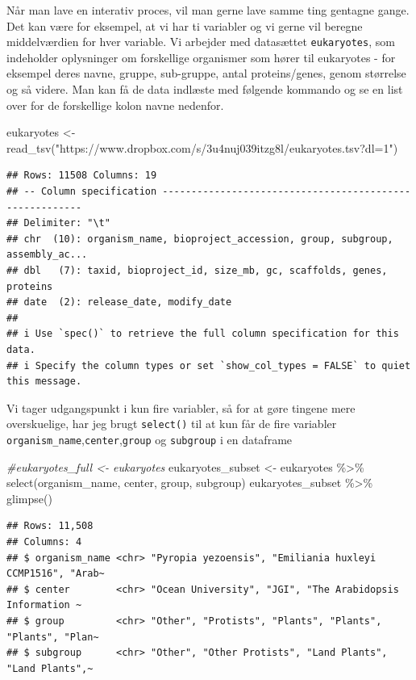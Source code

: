 \documentclass[
]{book}
\newenvironment{Shaded}{\begin{snugshade}}{\end{snugshade}}
\newcommand{\CommentTok}[1]{\textcolor[rgb]{0.56,0.35,0.01}{\textit{#1}}}
\newcommand{\FunctionTok}[1]{\textcolor[rgb]{0.00,0.00,0.00}{#1}}
\newcommand{\NormalTok}[1]{#1}
\newcommand{\OtherTok}[1]{\textcolor[rgb]{0.56,0.35,0.01}{#1}}
\newcommand{\SpecialCharTok}[1]{\textcolor[rgb]{0.00,0.00,0.00}{#1}}
\newcommand{\StringTok}[1]{\textcolor[rgb]{0.31,0.60,0.02}{#1}}
\begin{document}
Når man lave en interativ proces, vil man gerne lave samme ting gentagne gange. Det kan være for eksempel, at vi har ti variabler og vi gerne vil beregne middelværdien for hver variable. Vi arbejder med datasættet \texttt{eukaryotes}, som indeholder oplysninger om forskellige organismer som hører til eukaryotes - for eksempel deres navne, gruppe, sub-gruppe, antal proteins/genes, genom størrelse og så videre. Man kan få de data indlæste med følgende kommando og se en list over for de forskellige kolon navne nedenfor.

\begin{Shaded}
\begin{Highlighting}[]
\NormalTok{eukaryotes }\OtherTok{\textless{}{-}} \FunctionTok{read\_tsv}\NormalTok{(}\StringTok{"https://www.dropbox.com/s/3u4nuj039itzg8l/eukaryotes.tsv?dl=1"}\NormalTok{)}
\end{Highlighting}
\end{Shaded}

\begin{verbatim}
## Rows: 11508 Columns: 19
## -- Column specification --------------------------------------------------------
## Delimiter: "\t"
## chr  (10): organism_name, bioproject_accession, group, subgroup, assembly_ac...
## dbl   (7): taxid, bioproject_id, size_mb, gc, scaffolds, genes, proteins
## date  (2): release_date, modify_date
## 
## i Use `spec()` to retrieve the full column specification for this data.
## i Specify the column types or set `show_col_types = FALSE` to quiet this message.
\end{verbatim}

Vi tager udgangspunkt i kun fire variabler, så for at gøre tingene mere overskuelige, har jeg brugt \texttt{select()} til at kun får de fire variabler \texttt{organism\_name},\texttt{center},\texttt{group} og \texttt{subgroup} i en dataframe

\begin{Shaded}
\begin{Highlighting}[]
\CommentTok{\#eukaryotes\_full \textless{}{-} eukaryotes}
\NormalTok{eukaryotes\_subset }\OtherTok{\textless{}{-}}\NormalTok{ eukaryotes }\SpecialCharTok{\%\textgreater{}\%} \FunctionTok{select}\NormalTok{(organism\_name, center, group, subgroup)}
\NormalTok{eukaryotes\_subset }\SpecialCharTok{\%\textgreater{}\%} \FunctionTok{glimpse}\NormalTok{()}
\end{Highlighting}
\end{Shaded}

\begin{verbatim}
## Rows: 11,508
## Columns: 4
## $ organism_name <chr> "Pyropia yezoensis", "Emiliania huxleyi CCMP1516", "Arab~
## $ center        <chr> "Ocean University", "JGI", "The Arabidopsis Information ~
## $ group         <chr> "Other", "Protists", "Plants", "Plants", "Plants", "Plan~
## $ subgroup      <chr> "Other", "Other Protists", "Land Plants", "Land Plants",~
\end{verbatim}
\end{document}
